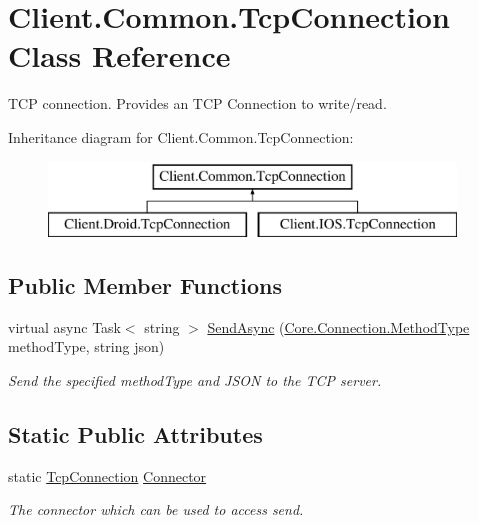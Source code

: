 \hypertarget{classClient_1_1Common_1_1TcpConnection}{}\section{Client.\+Common.\+Tcp\+Connection Class Reference}
\label{classClient_1_1Common_1_1TcpConnection}


T\+C\+P connection. Provides an T\+C\+P Connection to write/read.  


Inheritance diagram for Client.\+Common.\+Tcp\+Connection\+:\begin{figure}[H]
\begin{center}
\leavevmode
\includegraphics[height=2.000000cm]{classClient_1_1Common_1_1TcpConnection}
\end{center}
\end{figure}
\subsection*{Public Member Functions}
\begin{DoxyCompactItemize}
\item 
virtual async Task$<$ string $>$ \hyperlink{classClient_1_1Common_1_1TcpConnection_a2d0457442421976a677e6f24a14a92eb}{Send\+Async} (\hyperlink{namespaceCore_1_1Connection_a759585506f1f7f357beb5c5460a7f4f5}{Core.\+Connection.\+Method\+Type} method\+Type, string json)
\begin{DoxyCompactList}\small\item\em Send the specified method\+Type and J\+S\+O\+N to the T\+C\+P server. \end{DoxyCompactList}\end{DoxyCompactItemize}
\subsection*{Static Public Attributes}
\begin{DoxyCompactItemize}
\item 
static \hyperlink{classClient_1_1Common_1_1TcpConnection}{Tcp\+Connection} \hyperlink{classClient_1_1Common_1_1TcpConnection_a5522f2e8a44ff38a38844642920d6b7d}{Connector}
\begin{DoxyCompactList}\small\item\em The connector which can be used to access send. \end{DoxyCompactList}\end{DoxyCompactItemize}


